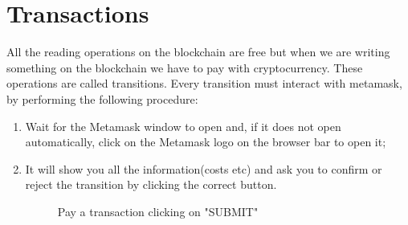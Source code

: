 \documentclass[ManualeUtente]{subfiles}
\begin{document}
\section{Transactions}
All the reading operations on the blockchain are free but when we are writing something on the blockchain we have to pay with cryptocurrency. These operations are called transitions.  
Every transition must interact with metamask, by performing the following procedure:
\begin{enumerate}
	\item Wait for the Metamask window to open and, if it does not open automatically, click on the Metamask logo on the browser bar to open it;
	\item It will show you all the information(costs etc) and ask you to confirm or reject the transition by clicking the correct button.
	\begin{figure}[H]
		\centering
		\caption{Pay a transaction clicking on "SUBMIT"}
		\label{fig:Pay a transaction clicking on "SUBMIT"}
	\end{figure}
\end{enumerate}

\newpage
\end{document}
